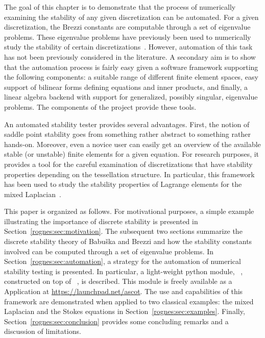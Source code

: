 The goal of this chapter is to demonstrate that the process of
numerically examining the stability of any given discretization can be
automated. For a given discretization, the Brezzi constants are
computable through a set of eigenvalue problems. These eigenvalue
problems have previously been used to numerically study the stability
of certain discretizations~\citep{ArnoldRognes2009, ChapelleBathe1993,
  Qin1994}. However, automation of this task has not been previously
considered in the literature. A secondary aim is to show that the
automation process is fairly easy given a software framework
supporting the following components: a suitable range of different
finite element spaces, easy support of bilinear forms defining
equations and inner products, and finally, a linear algebra backend
with support for generalized, possibly singular, eigenvalue
problems. The components of the \fenics{} project
provide these tools.

An automated stability tester provides several advantages. First, the
notion of saddle point stability goes from something rather abstract
to something rather hands-on. Moreover, even a novice user can easily
get an overview of the available stable (or unstable) finite elements
for a given equation. For research purposes, it provides a tool for
the careful examination of discretizations that have stability
properties depending on the tessellation structure. In particular,
this framework has been used to study the stability properties of
Lagrange elements for the mixed Laplacian~\citep{ArnoldRognes2009}.

This paper is organized as follows. For motivational purposes, a
simple example illustrating the importance of discrete stability is
presented in Section~\ref{rognes:sec:motivation}. The subsequent two
sections summarize the discrete stability theory of Babu\v ska and
Brezzi and how the stability constants involved can be computed
through a set of eigenvalue problems. In
Section~\ref{rognes:sec:automation}, a strategy for the automation of
numerical stability testing is presented. In particular, a
light-weight python module, \rognesascot{}~\citep{Rognes2009},
constructed on top of \pydolfin{}~\citep{LoggWells2010}, is
described. This module is freely available as a \fenics{} Application
at \url{https://launchpad.net/ascot}. The use and capabilities of this
framework are demonstrated when applied to two classical examples: the
mixed Laplacian and the Stokes equations in
Section~\ref{rognes:sec:examples}. Finally,
Section~\ref{rognes:sec:conclusion} provides some concluding remarks
and a discussion of limitations.

